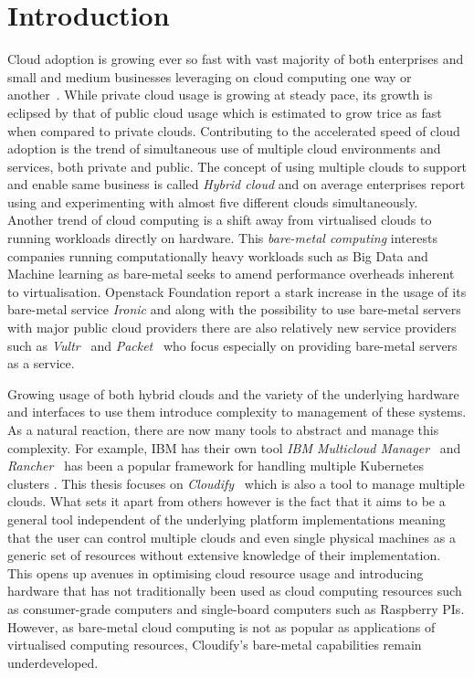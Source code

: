 \section{Introduction}

Cloud adoption is growing ever so fast with vast majority of both enterprises and small and medium businesses leveraging on cloud computing one way or another~\cite{stateofthecloud}. While private cloud usage is growing at steady pace, its growth is eclipsed by that of public cloud usage which is estimated to grow trice as fast when compared to private clouds. 
Contributing to the accelerated speed of cloud adoption is the trend of simultaneous use of multiple cloud environments and services, both private and public. The concept of using multiple clouds to support and enable same business is called \textit{Hybrid cloud} and on average enterprises report using and experimenting with almost five different clouds simultaneously. 
Another trend of cloud computing is a shift away from virtualised clouds to running workloads directly on hardware. This \textit  {bare-metal computing} interests companies running computationally heavy workloads such as Big Data and Machine learning as bare-metal seeks to amend performance overheads inherent to virtualisation. Openstack Foundation report a stark increase in the usage of its bare-metal service \textit{Ironic} \cite{openstacksurvey} and along with the possibility to use bare-metal servers with major public cloud providers there are also relatively new service providers such as \textit{Vultr}~\cite{vultr} and \textit{Packet}~\cite{packet} who focus especially on providing bare-metal servers as a service.

Growing usage of both hybrid clouds and the variety of the underlying hardware and interfaces to use them introduce complexity to management of these systems. As a natural reaction, there are now many tools to abstract and manage this complexity. For example, IBM has their own tool \textit{IBM Multicloud Manager}~\cite{ibmmulticloud} and \textit{Rancher}~\cite{rancher} has been a popular framework for handling multiple Kubernetes clusters \cite{Kubernetes}. This thesis focuses on \textit{Cloudify}~\cite{cloudify} which is also a tool to manage multiple clouds. What sets it apart from others however is the fact that it aims to be a general tool independent of the underlying platform implementations meaning that the user can control multiple clouds and even single physical machines as a generic set of resources without extensive knowledge of their implementation. This opens up avenues in optimising cloud resource usage and introducing hardware that has not traditionally been used as cloud computing resources such as consumer-grade computers and single-board computers such as Raspberry PIs. However, as bare-metal cloud computing is not as popular as applications of virtualised computing resources, Cloudify's bare-metal capabilities remain underdeveloped.

